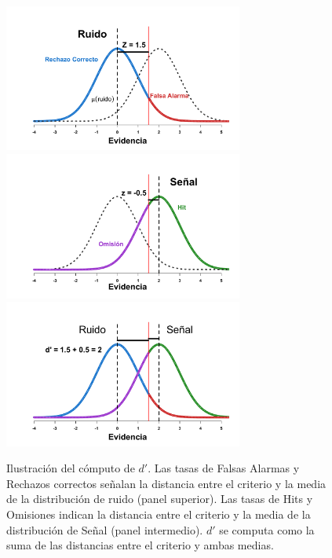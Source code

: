 \begin{itemize}
\begin{figure}[p]
\centering
\includegraphics[width=0.70\textwidth]{Figures/dR_1}\\ 
\includegraphics[width=0.70\textwidth]{Figures/dR_2}\\
\includegraphics[width=0.70\textwidth]{Figures/dR_3}\\ 
\caption[Estimación paramétrica: la discriminabilidad ($d'$)]{Ilustración del cómputo de $d'$. Las tasas de Falsas Alarmas y Rechazos correctos señalan la distancia entre el criterio y la media de la distribución de ruido (panel superior). Las tasas de Hits y Omisiones indican la distancia entre el criterio y la media de la distribución de Señal (panel intermedio). $d'$ se computa como la suma de las distancias entre el criterio y ambas medias.}
\label{fig:Graf_Discrim}
\end{figure}


\end{itemize}
